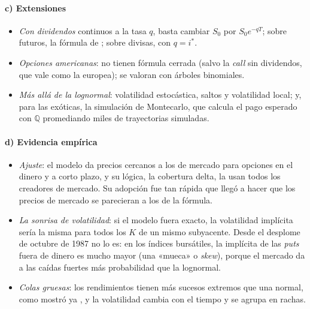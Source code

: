 \documentclass[11pt]{article}
\begin{document}
\begin{infografia}[H]
\centering
\caption{Cómo afecta cada variable a la \emph{call} y a la \emph{put} europeas, y su griega}\label{figu:determinantes-bs}
\end{infografia}

\paragraph{c) Extensiones}

\begin{itemize}
\item \emph{Con dividendos} continuos a la tasa $q$, basta cambiar $S_0$ por $S_0e^{-qT}$\nocite{Merton1973Theory}; sobre futuros, la fórmula de \textcite{Black1976Pricing}; sobre divisas, con $q=i^{*}$.
\item \emph{Opciones americanas}: no tienen fórmula cerrada (salvo la \emph{call} sin dividendos, que vale como la europea); se valoran con árboles binomiales.
\item \emph{Más allá de la lognormal}: volatilidad estocástica\nocite{Heston1993Closed}, saltos y volatilidad local; y, para las exóticas, la simulación de Montecarlo, que calcula el pago esperado con $\mathbb{Q}$ promediando miles de trayectorias simuladas.
\end{itemize}

\paragraph{d) Evidencia empírica}

\begin{itemize}
\item \emph{Ajuste}: el modelo da precios cercanos a los de mercado para opciones en el dinero y a corto plazo, y su lógica, la cobertura delta, la usan todos los creadores de mercado. Su adopción fue tan rápida que llegó a hacer que los precios de mercado se parecieran a los de la fórmula\nocite{MacKenzieMillo2003Constructing}.
\item \emph{La sonrisa de volatilidad}: si el modelo fuera exacto, la volatilidad implícita sería la misma para todos los $K$ de un mismo subyacente. Desde el desplome de octubre de 1987 no lo es: en los índices bursátiles, la implícita de las \emph{puts} fuera de dinero es mucho mayor (una «mueca» o \emph{skew}), porque el mercado da a las caídas fuertes más probabilidad que la lognormal\nocite{Rubinstein1994Implied}.
\item \emph{Colas gruesas}: los rendimientos tienen más sucesos extremos que una normal, como mostró ya \textcite{Mandelbrot1963Variation}, y la volatilidad cambia con el tiempo y se agrupa en rachas.
\end{itemize}
\end{document}
